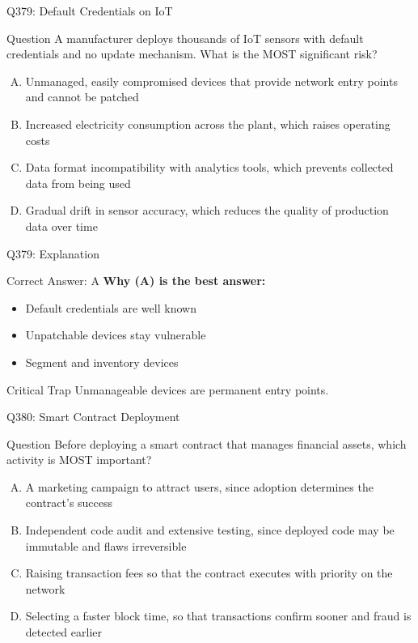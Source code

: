 \documentclass{beamer}
\begin{document}
	\begin{frame}{Q379: Default Credentials on IoT}
		\begin{block}{Question}
			\small A manufacturer deploys thousands of IoT sensors with default credentials and no update mechanism. What is the MOST significant risk?
		\end{block}
		\begin{enumerate}[(A)]
			\footnotesize
			\item Unmanaged, easily compromised devices that provide network entry points and cannot be patched
			\item Increased electricity consumption across the plant, which raises operating costs
			\item Data format incompatibility with analytics tools, which prevents collected data from being used
			\item Gradual drift in sensor accuracy, which reduces the quality of production data over time
		\end{enumerate}
	\end{frame}
	
	\begin{frame}{Q379: Explanation}
		\begin{block}{Correct Answer: A}
			\textbf{Why (A) is the best answer:}
			\begin{itemize}
				\item Default credentials are well known
				\item Unpatchable devices stay vulnerable
				\item Segment and inventory devices
			\end{itemize}
		\end{block}
		\begin{alertblock}{Critical Trap}
			Unmanageable devices are permanent entry points.
		\end{alertblock}
	\end{frame}
	
	\begin{frame}{Q380: Smart Contract Deployment}
		\begin{block}{Question}
			\small Before deploying a smart contract that manages financial assets, which activity is MOST important?
		\end{block}
		\begin{enumerate}[(A)]
			\footnotesize
			\item A marketing campaign to attract users, since adoption determines the contract's success
			\item Independent code audit and extensive testing, since deployed code may be immutable and flaws irreversible
			\item Raising transaction fees so that the contract executes with priority on the network
			\item Selecting a faster block time, so that transactions confirm sooner and fraud is detected earlier
		\end{enumerate}
	\end{frame}
	
\end{document}
